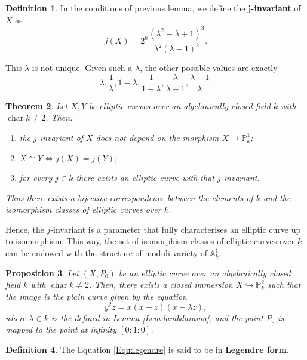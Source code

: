 \documentclass{report}
\DeclareMathOperator{\chara}{char}
\newtheorem{theorem}{Theorem}[chapter]
\newtheorem{proposition}[theorem]{Proposition}
\theoremstyle{definition}
\newtheorem{definition}[theorem]{Definition}
\begin{document}
\begin{definition}
\label{Def:j-invariant}
In the conditions of previous lemma, we define the \textbf{$\boldsymbol{j}$-invariant} of $X$ as
\[j(X)=2^8\frac{(\lambda^2-\lambda+1)^3}{\lambda^2(\lambda-1)^2}.\]

This $\lambda$ is not unique. Given such a $\lambda$, the other possible values are exactly
\[\lambda,\frac{1}{\lambda},1-\lambda,\frac{1}{1-\lambda},\frac{\lambda}{\lambda-1},\frac{\lambda-1}{\lambda}.\]
\end{definition}

\begin{theorem}
Let $X,Y$ be elliptic curves over an algebraically closed field $k$ with $\chara k\neq2$. Then:
\begin{enumerate}
\item the $j$-invariant of $X$ does not depend on the morphism $X\rightarrow\mathbb{P}_k^1$;
\item $X\cong Y\Leftrightarrow j(X)=j(Y)$;
\item for every $j\in k$ there exists an elliptic curve with that $j$-invariant.
\end{enumerate}

Thus there exists a bijective correspondence between the elements of $k$ and the isomorphism classes of elliptic curves over $k$.
\end{theorem}

Hence, the $j$-invariant is a parameter that fully characterises an elliptic curve up to isomorphism. This way, the set of isomorphism classes of elliptic curves over $k$ can be endowed with the structure of moduli variety of $\mathbb{A}_k^1$.

\begin{proposition}
Let $(X,P_0)$ be an elliptic curve over an algebraically closed field $k$ with $\chara k\neq2$. Then, there exists a closed immersion $X\hookrightarrow\mathbb{P}_k^2$ such that the image is the plain curve given by the equation
\begin{equation}
\label{Equ:legendre}
y^2z=x(x-z)(x-\lambda z),
\end{equation}
where $\lambda\in k$ is the defined in Lemma \ref{Lem:lambdarama}, and the point $P_0$ is mapped to the point at infinity $[0:1:0]$.
\end{proposition}

\begin{definition}
The Equation \eqref{Equ:legendre} is said to be in \textbf{Legendre form}.
\end{definition}
\end{document}
